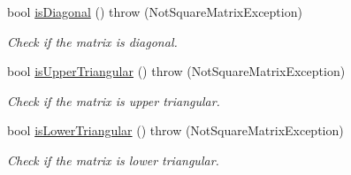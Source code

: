 \begin{CompactItemize}
$$bool \hyperlink{classgrassmann_1_1Matrix_0ec5a24568e808ce4fc48514842e7633}{isDiagonal} ()  throw (NotSquareMatrixException)
\begin{CompactList}\small\item\em Check if the matrix is diagonal. \item\end{CompactList}\item 
bool \hyperlink{classgrassmann_1_1Matrix_9e2ca56c045111a88dd23583c4d03f8e}{isUpperTriangular} ()  throw (NotSquareMatrixException)
\begin{CompactList}\small\item\em Check if the matrix is upper triangular. \item\end{CompactList}\item 
bool \hyperlink{classgrassmann_1_1Matrix_dda0c95c0df60ee264883c22da6d8b76}{isLowerTriangular} ()  throw (NotSquareMatrixException)
\begin{CompactList}\small\item\em Check if the matrix is lower triangular. \item\end{CompactList}\end{CompactItemize}
